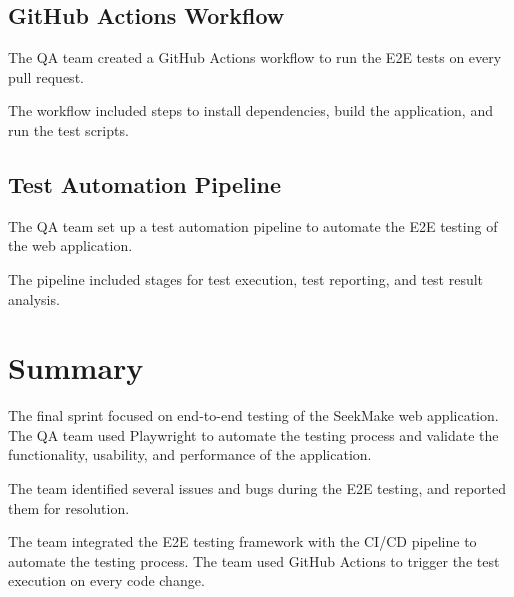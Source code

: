 \subsection{GitHub Actions Workflow}

The QA team created a GitHub Actions workflow to run the E2E tests on every pull request.

The workflow included steps to install dependencies, build the application, and run the test scripts.

\subsection{Test Automation Pipeline}

The QA team set up a test automation pipeline to automate the E2E testing of the web application.

The pipeline included stages for test execution, test reporting, and test result analysis.

\section{Summary}

The final sprint focused on end-to-end testing of the SeekMake web application. The QA team used Playwright to automate the testing process and validate the functionality, usability, and performance of the application.

The team identified several issues and bugs during the E2E testing, and reported them for resolution.

The team integrated the E2E testing framework with the CI/CD pipeline to automate the testing process. The team used GitHub Actions to trigger the test execution on every code change.
